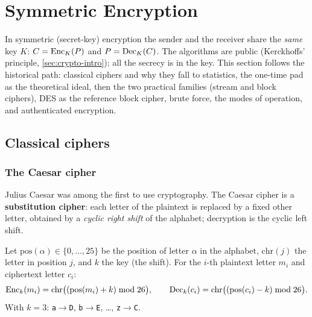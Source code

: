 \section{Symmetric Encryption}
\label{sec:symmetric}

In symmetric (secret-key) encryption the sender and the receiver share the \emph{same} key $K$: $C = \operatorname{Enc}_K(P)$ and $P = \operatorname{Dec}_K(C)$. The algorithms are public (Kerckhoffs' principle, \cref{sec:crypto-intro}); all the secrecy is in the key. This section follows the historical path: classical ciphers and why they fall to statistics, the one-time pad as the theoretical ideal, then the two practical families (stream and block ciphers), DES as the reference block cipher, brute force, the modes of operation, and authenticated encryption.


\subsection{Classical ciphers}

\subsubsection{The Caesar cipher}

Julius Caesar was among the first to use cryptography. The Caesar cipher is a \textbf{substitution cipher}: each letter of the plaintext is replaced by a fixed other letter, obtained by a \emph{cyclic right shift} of the alphabet; decryption is the cyclic left shift.

\begin{definition}
Let $\mathrm{pos}(\alpha) \in \{0,\dots,25\}$ be the position of letter $\alpha$ in the alphabet, $\mathrm{chr}(j)$ the letter in position $j$, and $k$ the key (the shift). For the $i$-th plaintext letter $m_i$ and ciphertext letter $c_i$:
\[
    \operatorname{Enc}_k(m_i) = \mathrm{chr}\bigl((\mathrm{pos}(m_i) + k) \bmod 26\bigr), \qquad
    \operatorname{Dec}_k(c_i) = \mathrm{chr}\bigl((\mathrm{pos}(c_i) - k) \bmod 26\bigr).
\]
With $k = 3$: \texttt{a}$\to$\texttt{D}, \texttt{b}$\to$\texttt{E}, \dots, \texttt{z}$\to$\texttt{C}.
\end{definition}

